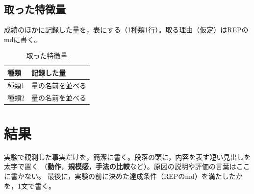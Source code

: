 \documentclass[twocolumn, 10pt]{ujarticle}
\begin{document}
\subsection{取った特徴量}\label{sec:e-feat}

成績のほかに記録した量を，表にする（1種類1行）。取る理由（仮定）はREPのmdに書く。

\begin{table}[H]
\centering
\caption{取った特徴量}
\label{tab:e-feat}
\footnotesize
\begin{tabularx}{\linewidth}{@{}l>{\raggedright\arraybackslash}X@{}}
\toprule
種類 & 記録した量 \\
\midrule
種類1 & 量の名前を並べる \\
種類2 & 量の名前を並べる \\
\bottomrule
\end{tabularx}
\end{table}

\section{結果}\label{sec:e-result}

実験で観測した事実だけを，簡潔に書く。段落の頭に，内容を表す短い見出しを太字で置く
（\textbf{動作}，\textbf{規模感}，\textbf{手法の比較}など）。原因の説明や評価の言葉はここに書かない。
最後に，実験の前に決めた達成条件（REPのmd）を満たしたかを，1文で書く。

\end{document}
